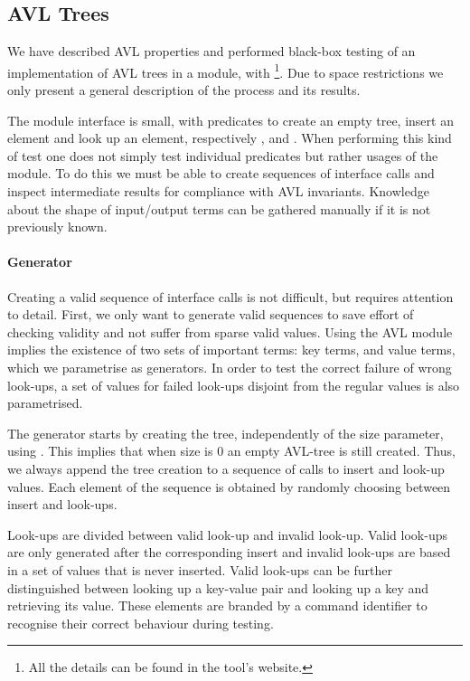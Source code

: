 
\subsection{AVL Trees}

We have described AVL properties and performed black-box testing of an
implementation of AVL trees in a \Yap{} module,  with
\plqc{}\footnote{All the details can be found in the tool's website.}.
Due to space restrictions we only present a general description of the
process and its results. 


The module interface is small, with predicates to create an empty
tree, insert an element and look up an element, respectively
,  and .
%
When performing this kind of test one does not simply test individual
predicates but rather usages of the module.
%
To do this we must be able to create sequences of interface
calls and inspect intermediate results for compliance with AVL
invariants.
%
Knowledge about the shape of input/output terms can be gathered manually
if it is not previously known.


\paragraph{\bf Generator}

Creating a valid sequence of interface calls is not difficult, but
requires attention to detail.
%
First, we only want to generate valid sequences to save effort of
checking validity and not suffer from sparse valid values.
%
Using the AVL module implies the existence of two sets of important
terms: key terms, and value terms, which we parametrise as generators.
%
In order to test the correct failure of wrong look-ups, a set of values
for failed look-ups disjoint from the regular values is also
parametrised.


The generator starts by creating the tree, independently of the
size parameter, using .
%
This implies that when size is 0 an empty AVL-tree is still created.
%
Thus, we always append the tree creation to a sequence of calls to
insert and look-up values.
%
Each element of the sequence is obtained by randomly choosing between
insert and look-ups.


Look-ups are divided between valid look-up and invalid look-up.
%
Valid look-ups are only generated after the corresponding insert and
invalid look-ups are based in a set of values that is never inserted.
%
Valid look-ups can be further distinguished between looking up a
key-value pair and looking up a key and retrieving its value.
%
These elements are  branded by a command identifier to recognise their
correct behaviour during testing.


